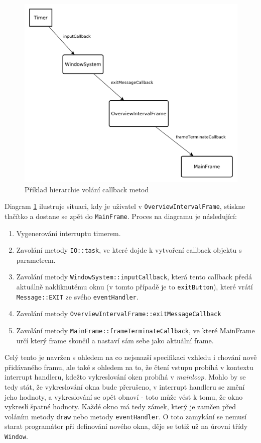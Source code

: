 \begin{figure}[tbh!]\centering
\includegraphics[scale=0.6]{../diagrams/stm_callback_metody.pdf}
\caption{Příklad hierarchie volání callback metod}
\label{fig:stm-callback-metody}
\end{figure}

Diagram \ref{fig:stm-callback-metody} ilustruje situaci, kdy je uživatel v \texttt{OverviewIntervalFrame}, stiskne
tlačítko  a dostane se zpět do \texttt{MainFrame}.
Proces na diagramu je následující:
\begin{enumerate}
  \item Vygenerování interruptu timerem.
  \item Zavolání metody \texttt{IO::task}, ve které dojde k vytvoření callback objektu s parametrem.
  \item Zavolání metody \texttt{WindowSystem::inputCallback}, která tento callback předá aktuálně
    nakliknutému oknu (v tomto případě je to \texttt{exitButton}), které vrátí \texttt{Message::EXIT}
    ze svého \texttt{eventHandler}.
  \item Zavolání metody \texttt{OverviewIntervalFrame::exitMessageCallback}
  \item Zavolání metody \texttt{MainFrame::frameTerminateCallback}, ve které MainFrame určí který
    frame skončil a nastaví sám sebe jako aktuální frame.
\end{enumerate}

Celý tento  je navržen s ohledem na co nejsnazší specifikaci vzhledu i chování nově přidávaného
framu, ale také s ohledem na to, že čtení vstupu probíhá v kontextu interrupt handleru, kdežto vykreslování
oken probíhá v \emph{mainloop}.
Mohlo by se tedy stát, že vykreslování okna bude přerušeno, v interrupt handleru se změní jeho hodnoty,
a vykreslování se opět obnoví - toto může vést k tomu, že okno vykreslí špatné hodnoty.
Každé okno má tedy zámek, který je zamčen před voláním metody \texttt{draw} nebo metody \texttt{eventHandler}.
O toto zamykání se nemusí starat programátor při definování nového okna, děje se totiž už na úrovni
třídy \texttt{Window}.

